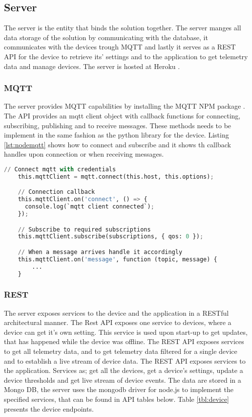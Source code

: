 \subsection{Server}
The server is the entity that binds the solution together. The server manges all data storage of the solution by communicating with the database, it communicates with the devices trough MQTT and lastly it serves as a REST API for the device to retrieve its' settings and to the application to get telemetry data and manage devices. The server is hosted at Heroku \cite{heroku}. 

\subsubsection*{MQTT}
The server provides MQTT capabilities by installing the MQTT NPM package \cite{mqtt}. The API provides an mqtt client object with callback functions for connecting, subscribing, publishing and to receive messages. These methods needs to be implement in the same fashion as the python library for the device. Listing \ref{lst:nodemqtt} shows how to connect and subscribe and it shows th callback handles upon connection or when receiving messages. 

\begin{lstlisting}[language=Python, caption=Node.js MQTT, label={lst:nodemqtt}, basicstyle=\scriptsize]
    // Connect mqtt with credentials
    this.mqttClient = mqtt.connect(this.host, this.options);

    // Connection callback
    this.mqttClient.on('connect', () => {
      console.log(`mqtt client connected`);
    });

    // Subscribe to required subscriptions
    this.mqttClient.subscribe(subscriptions, { qos: 0 });

    // When a message arrives handle it accordingly
    this.mqttClient.on('message', function (topic, message) {
        ...
    }
\end{lstlisting}

\subsubsection*{REST}
The server exposes services to the device and the application in a RESTful architectural manner. The Rest API exposes one service to devices, where a device can get it's own setting. This service is used upon start-up to get updates, that has happened while the device was offline. 
The REST API exposes services to get all telemetry data, and to get telemetry data filtered for a single device and to establish a live stream of device data. 
The REST API exposes services to the application. Services as; get all the devices, get a device's settings, update a device thresholds and get live stream of device events. The data are stored in a Mongo DB, the server uses the mongodb driver for node.js \cite{mongodriver} to implement the specified services, that can be found in API tables below. Table \ref{tbl:device} presents the device endpoints. 

